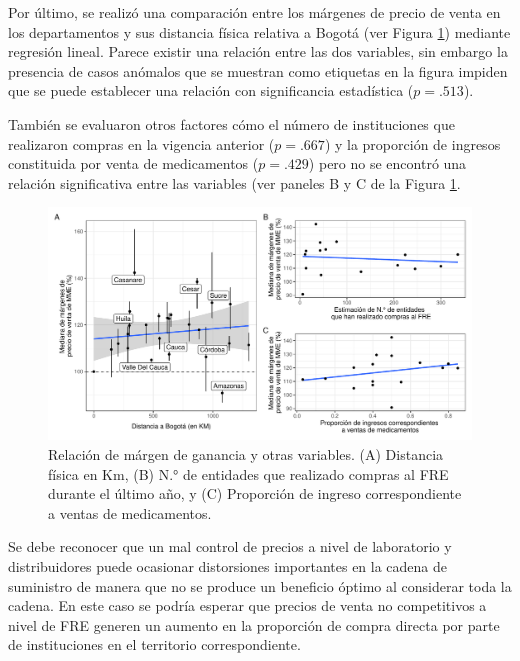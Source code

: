 \documentclass[
]{book}
\begin{document}
Por último, se realizó una comparación entre los márgenes de precio de venta en los departamentos y sus distancia física relativa a Bogotá (ver Figura \ref{fig:relacionMargenesCosto}) mediante regresión lineal. Parece existir una relación entre las dos variables, sin embargo la presencia de casos anómalos que se muestran como etiquetas en la figura impiden que se puede establecer una relación con significancia estadística (\(p = .513\)).

También se evaluaron otros factores cómo el número de instituciones que realizaron compras en la vigencia anterior (\(p = .667\)) y la proporción de ingresos constituida por venta de medicamentos (\(p = .429\)) pero no se encontró una relación significativa entre las variables (ver paneles B y C de la Figura \ref{fig:relacionMargenesCosto}.

\begin{figure}

{\centering \includegraphics[width=0.95\linewidth]{InformeFinal_files/figure-latex/relacionMargenesCosto-1} 

}

\caption{Relación de márgen de ganancia y otras variables. (A) Distancia física en Km, (B) N.° de entidades que realizado compras al FRE durante el último año, y (C) Proporción de ingreso correspondiente a ventas de medicamentos.}\label{fig:relacionMargenesCosto}
\end{figure}

Se debe reconocer que un mal control de precios a nivel de laboratorio y distribuidores puede ocasionar distorsiones importantes en la cadena de suministro de manera que no se produce un beneficio óptimo al considerar toda la cadena. En este caso se podría esperar que precios de venta no competitivos a nivel de FRE generen un aumento en la proporción de compra directa por parte de instituciones en el territorio correspondiente.
\end{document}
